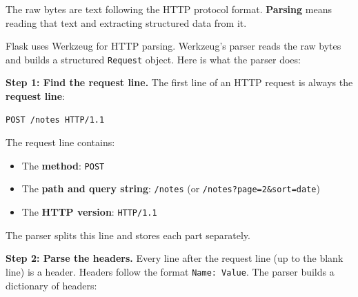 The raw bytes are text following the HTTP protocol format. \textbf{Parsing} means reading that text and extracting structured data from it.

Flask uses Werkzeug for HTTP parsing. Werkzeug's parser reads the raw bytes and builds a structured \texttt{Request} object. Here is what the parser does:

\textbf{Step 1: Find the request line.} The first line of an HTTP request is always the \textbf{request line}:

\begin{outputbox}[short]
\begin{Verbatim}[fontsize=\codesize, breaklines, breakanywhere, breaksymbolleft={\tiny\textcolor{muted}{$\hookrightarrow$}}]
POST /notes HTTP/1.1
\end{Verbatim}
\end{outputbox}

\noindent{}The request line contains:

\begin{itemize}
\tightlist
\item
  The \textbf{method}: \texttt{POST}
\item
  The \textbf{path and query string}: \texttt{/notes} (or \texttt{/}\allowbreak{}\texttt{notes?}\allowbreak{}\texttt{page=}\allowbreak{}\texttt{2\&}\allowbreak{}\texttt{sort=}\allowbreak{}\texttt{date})
\item
  The \textbf{HTTP version}: \texttt{HTTP/1.1}
\end{itemize}

\noindent{}The parser splits this line and stores each part separately.

\textbf{Step 2: Parse the headers.} Every line after the request line (up to the blank line) is a header. Headers follow the format \texttt{Name:\ Value}. The parser builds a dictionary of headers:

\begin{codebox}[short]

\begin{Shaded}
\begin{Highlighting}[]
\NormalTok{\{}
    \NormalTok{: }\NormalTok{,}
    \NormalTok{: }\NormalTok{,}
    \NormalTok{: }\NormalTok{,}
    \NormalTok{: }\NormalTok{,}
    \NormalTok{: }\NormalTok{,}
\NormalTok{\}}
\end{Highlighting}
\end{Shaded}

\end{codebox}

